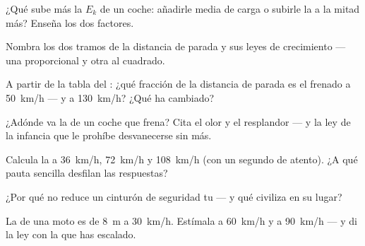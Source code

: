 \begin{exercise}[$\star$]\label{exo:g9:kinetic-energy-safety:3}
¿Qué sube más la $E_k$ de un coche: añadirle media  de carga
o subirle la  a la mitad más? Enseña los dos factores.
\end{exercise}

\begin{exercise}[$\star$]\label{exo:g9:kinetic-energy-safety:4}
Nombra los dos tramos de la distancia de parada y sus leyes de
crecimiento --- una proporcional y otra al cuadrado.
\end{exercise}

\begin{exercise}[$\star$]\label{exo:g9:kinetic-energy-safety:5}
A partir de la tabla del : ¿qué fracción de la distancia de
parada es el frenado a \qty{50}{km/h} --- y a \qty{130}{km/h}? ¿Qué ha
cambiado?
\end{exercise}

\begin{exercise}[$\star$]\label{exo:g9:kinetic-energy-safety:6}
¿Adónde va la  de un coche que frena? Cita el olor
y el resplandor --- y la ley de la infancia que le prohíbe
desvanecerse sin más.
\end{exercise}

\begin{exercise}[$\star$]\label{exo:g9:kinetic-energy-safety:7}
Calcula la  a \qty{36}{km/h},
\qty{72}{km/h} y \qty{108}{km/h} (con un segundo de  atento).
¿A qué pauta sencilla desfilan las respuestas?
\end{exercise}

\begin{exercise}[$\star$]\label{exo:g9:kinetic-energy-safety:8}
¿Por qué no reduce un cinturón de seguridad tu 
--- y qué civiliza en su lugar?
\end{exercise}

\begin{exercise}[$\star\star$]\label{exo:g9:kinetic-energy-safety:9}
La  de una moto es de \qty{8}{m} a
\qty{30}{km/h}. Estímala a \qty{60}{km/h} y a \qty{90}{km/h} --- y di
la ley con la que has escalado.
\end{exercise}

